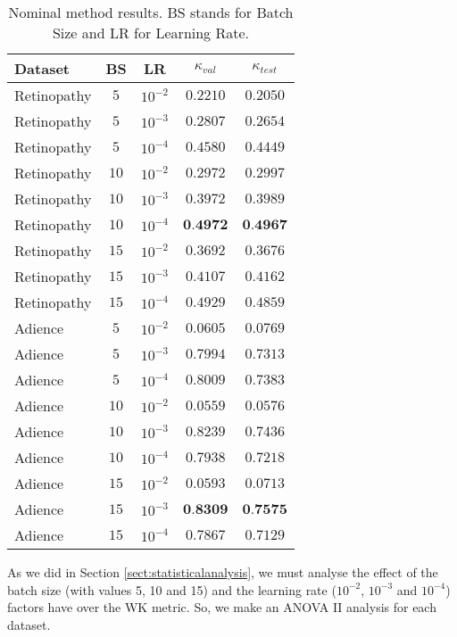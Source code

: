 \documentclass[10pt, a4paper, titlepage, twocolumn]{article}
\begin{document}
	\begin{table}[ht]
		\footnotesize
		\centering
		\begin{tabular}{lcc|cc}
			Dataset & BS & LR & $\kappa_{val}$ & $\kappa_{test}$\\\hline\addlinespace[0.05cm]
			Retinopathy & $5$ & $10^{-2}$ & $0.2210$ & $0.2050$\\
			Retinopathy & $5$ & $10^{-3}$ & $0.2807$ & $0.2654$\\
			Retinopathy & $5$ & $10^{-4}$ & $0.4580$ & $0.4449$\\
			
			Retinopathy & $10$ & $10^{-2}$ & $0.2972$ & $0.2997$\\
			Retinopathy & $10$ & $10^{-3}$ & $0.3972$ & $0.3989$\\
			Retinopathy & $10$ & $10^{-4}$ & $\textbf{0.4972}$ & $\textbf{0.4967}$\\
			
			Retinopathy & $15$ & $10^{-2}$ & $0.3692$ & $0.3676$\\
			Retinopathy & $15$ & $10^{-3}$ & $0.4107$ & $0.4162$\\
			Retinopathy & $15$ & $10^{-4}$ & $0.4929$ & $0.4859$\\
			\hline\addlinespace[0.05cm]
			Adience & $5$ & $10^{-2}$ & $0.0605$ & $0.0769$\\
			Adience & $5$ & $10^{-3}$ & $0.7994$ & $0.7313$\\
			Adience & $5$ & $10^{-4}$ & $0.8009$ & $0.7383$\\
			
			Adience & $10$ & $10^{-2}$ & $0.0559$ & $0.0576$\\
			Adience & $10$ & $10^{-3}$ & $0.8239$ & $0.7436$\\
			Adience & $10$ & $10^{-4}$ & $0.7938$ & $0.7218$\\
			
			Adience & $15$ & $10^{-2}$ & $0.0593$ & $0.0713$\\
			Adience & $15$ & $10^{-3}$ & $\textbf{0.8309}$ & $\textbf{0.7575}$\\
			Adience & $15$ & $10^{-4}$ & $0.7867$ & $0.7129$\\
		\end{tabular}
		\caption{Nominal method results. BS stands for Batch Size and LR for Learning Rate.}
		\label{table:NominalResults}
	\end{table}
	
	As we did in Section \ref{sect:statisticalanalysis}, we must analyse the effect of the batch size (with values 5, 10 and 15) and the learning rate ($10^{-2}$, $10^{-3}$ and $10^{-4}$) factors have over the WK metric. So, we make an ANOVA II analysis for each dataset.
	
\end{document}
